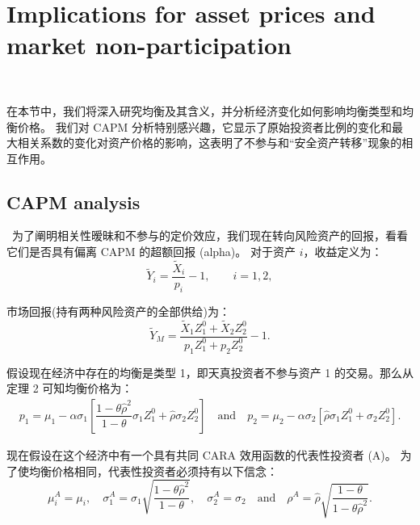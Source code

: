 \documentclass[10.0pt]{article}
\begin{document}
\section{Implications for asset prices and market non-participation}

\quad \ 


在本节中，我们将深入研究均衡及其含义，并分析经济变化如何影响均衡类型和均衡价格。 我们对 CAPM 分析特别感兴趣，它显示了原始投资者比例的变化和最大相关系数的变化对资产价格的影响，这表明了不参与和``安全资产转移''现象的相互作用。

\subsection{CAPM analysis}
\quad \ 
为了阐明相关性暧昧和不参与的定价效应，我们现在转向风险资产的回报，看看它们是否具有偏离 CAPM 的超额回报 (alpha)。 对于资产 $i$，收益定义为：
\begin{equation*}
\tilde{Y}_i = \dfrac{\tilde{X}_i}{p_i} - 1, \qquad i = 1, 2,
\end{equation*}

市场回报(持有两种风险资产的全部供给)为：
\begin{equation*}
\tilde{Y}_M = \dfrac{\tilde{X}_1 Z_1^0 + \tilde{X}_2 Z_2^0}{p_1 Z_1^0 + p_2 Z_2^0} - 1. 
\end{equation*}



假设现在经济中存在的均衡是类型 1，即天真投资者不参与资产 1 的交易。那么从定理 2 可知均衡价格为：
\begin{eqnarray*}
p_1 = \mu_1 - \alpha \sigma_1 \left[ \dfrac{1 - \theta {\hat \rho}^2}{1 - \theta} \sigma_1 Z_1^0 + {\hat \rho} \sigma_2 Z_2^0 \right] \quad \text{and} \quad p_2 = \mu_2 - \alpha \sigma_2 \left[ {\hat \rho} \sigma_1 Z_1^0 + \sigma_2 Z_2^0 \right].
\end{eqnarray*}



现在假设在这个经济中有一个具有共同 CARA 效用函数的代表性投资者 (A)。 为了使均衡价格相同，代表性投资者必须持有以下信念：
\begin{equation*}
\mu_i^A = \mu_i, \quad \sigma_1^A = \sigma_1 \sqrt{\dfrac{1 - \theta \hat{\rho}^2}{1 - \theta}}, \quad \sigma_2^A = \sigma_2 \quad \text{and} \quad \rho^A = \hat{\rho} \sqrt{\dfrac{1 - \theta}{1 - \theta \hat{\rho}^2}}. 
\end{equation*}
\end{document}
